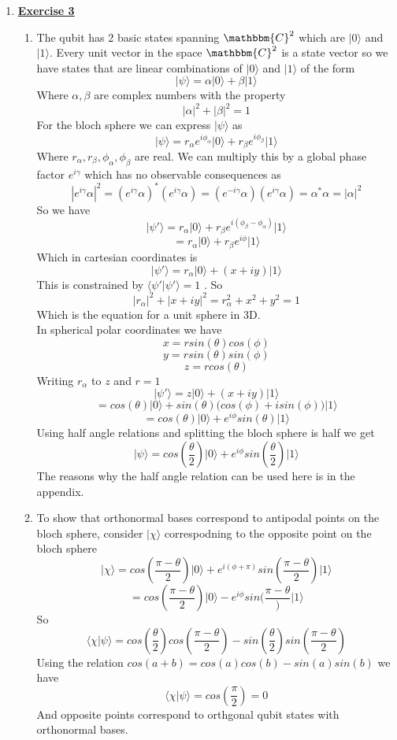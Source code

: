 \documentclass[12pt]{article}
\newcommand{\ket}[1]{\vert{#1}\rangle}
\begin{document}
\begin{enumerate}
\item \textbf{\underline{Exercise 3}} \\
\begin{enumerate}
    \item The qubit has 2 basic states spanning $\mathbbm{C}^2$ which are $\ket{0}$ and $\ket{1}$. Every unit vector in the space $\mathbbm{C}^2$  is a state vector so we have states that are linear combinations of $\ket{0}$ and $\ket{1}$ of the form 
    $$ \ket{\psi} = \alpha \ket{0} + \beta \ket{1} $$ 
    Where $\alpha, \beta$ are complex numbers with the property 
    $$ |\alpha|^2 + |\beta |^2 = 1 $$
    For the bloch sphere we can express $\ket{\psi}$ as 
    $$ \ket{\psi} = r_{\alpha} e^{i \phi_{\alpha}} \ket{0} + r_{\beta} e^{i \phi_{\beta}} \ket{1} $$
    Where $r_{\alpha}, r_{\beta}, \phi_{\alpha},\phi_{\beta}$ are real. We can multiply this by a global phase factor $e^{i \gamma}$ which has no observable consequences as 
    $$ |e^{i \gamma} \alpha | ^2 = (e^{i \gamma} \alpha)^* (e^{i \gamma} \alpha) = (e^{-i \gamma}\alpha)(e^{i \gamma} \alpha) = \alpha^* \alpha = |\alpha|^2 $$
    So we have 
    $$ \ket{\psi '} = r_{\alpha} \ket{0} + r_{\beta} e^{i(\phi_{\beta}- \phi_{\alpha})} \ket{1} $$
    $$ = r_{\alpha} \ket{0} + r_{\beta} e^{i \phi} \ket{1} $$
    Which in cartesian coordinates is 
    $$ \ket{\psi '} = r_{\alpha} \ket{0} + (x + iy) \ket{1} $$
    This is constrained by $\langle \psi ' | \psi ' \rangle =1$ . So 
    $$ |r_{\alpha}|^2 + |x+iy|^2 = r_{\alpha}^2 + x^2 + y^2 = 1 $$
    Which is the equation for a unit sphere in 3D. 
    \\
    In spherical polar coordinates we have 
    $$ x = r sin(\theta) cos(\phi) $$
    $$ y = r sin(\theta) sin(\phi) $$
    $$ z = rcos(\theta) $$ 
    Writing $r_{\alpha}$ to $z$ and $r =1$ 
    $$ \ket{\psi '} = z \ket{0} + (x+iy) \ket{1} $$
    $$ = cos(\theta) \ket{0} + sin(\theta)\Big(cos(\phi) + isin(\phi)\Big) \ket{1} $$
    $$ = cos(\theta) \ket{0} + e^{i \phi} sin(\theta) \ket{1} $$
    Using half angle relations and splitting the bloch sphere is half we get 
    $$ \ket{\psi} = cos(\frac{\theta}{2}) \ket{0} + e^{i \phi} sin(\frac{\theta}{2}) \ket{1} $$ 
    The reasons why the half angle relation can be used here is in the appendix. 

    \item To show that orthonormal bases correspond to antipodal points on the bloch sphere, consider $\ket{\chi}$ correspodning to the opposite point on the bloch sphere 
    $$ \ket{\chi} = cos(\frac{\pi - \theta}{2}) \ket{0} + e^{i(\phi + \pi)} sin(\frac{\pi - \theta}{2}) \ket{1} $$
    $$ = cos(\frac{\pi - \theta}{2}) \ket{0} - e^{i \phi} sin(\frac{\pi - \theta}) \ket{1} $$
    So 
    $$ \langle \chi | \psi \rangle = cos(\frac{\theta}{2}) cos(\frac{\pi - \theta}{2}) - sin(\frac{\theta}{2})sin(\frac{\pi - \theta}{2}) $$
    Using the relation $cos(a+b) = cos(a)cos(b) -sin(a)sin(b) $ we have 
    $$ \langle \chi | \psi \rangle = cos(\frac{\pi}{2}) = 0 $$ 
    And opposite points correspond to orthgonal qubit states with orthonormal bases. 


\end{enumerate}
\end{enumerate}
\end{document}
